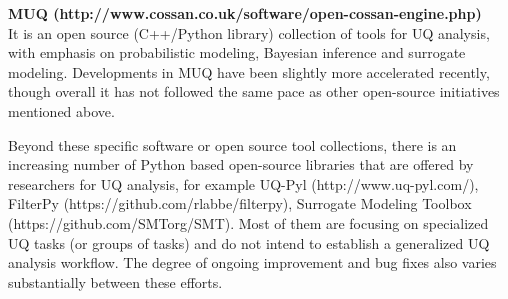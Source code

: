 \noindent\textbf{MUQ (http://www.cossan.co.uk/software/open-cossan-engine.php)} \\It is an open source (C++/Python library) collection of tools for UQ analysis, with emphasis on probabilistic modeling, Bayesian inference and surrogate modeling. Developments in MUQ have been slightly more accelerated recently, though overall it has not followed the same pace as other open-source initiatives mentioned above.

Beyond these specific software or open source tool collections, there is an increasing number of Python based open-source libraries that are offered by researchers for UQ analysis, for example UQ-Pyl (http://www.uq-pyl.com/), FilterPy (https://github.com/rlabbe/filterpy), Surrogate Modeling Toolbox (https://github.com/SMTorg/SMT). Most of them are focusing on specialized UQ tasks (or groups of tasks) and do not intend to establish a generalized UQ analysis workflow. The degree of ongoing improvement and bug fixes also varies substantially between these efforts. 

